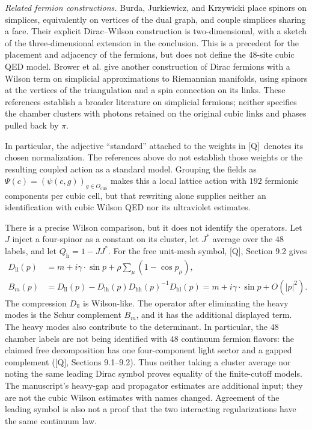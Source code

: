 \documentclass[11pt]{article}
\numberwithin{equation}{section}
\newcommand{\Q}{\textup{[Q]}}
\begin{document}
\emph{Related fermion constructions.} Burda, Jurkiewicz, and
Krzywicki \cite[Section 1 and Section 2.4]{BurdaJurkiewiczKrzywicki1999}
place spinors on simplices, equivalently on vertices of the dual
graph, and couple simplices sharing a face. Their explicit
Dirac--Wilson construction is two-dimensional, with a sketch of
the three-dimensional extension in the conclusion. This is a
precedent for the placement and adjacency of the fermions, but
does not define the $48$-site cubic QED model. Brower et al.
\cite[Sections 3--4]{BrowerEtAl2017} give another construction of
Dirac fermions with a Wilson term on simplicial approximations to
Riemannian manifolds, using spinors at the vertices of the
triangulation and a spin connection on its links. These references
establish a broader literature on simplicial fermions; neither
specifies the chamber clusters with photons retained on the
original cubic links and phases pulled back by $\pi$.

In particular, the adjective ``standard'' attached to the weights
in \Q\ denotes its chosen normalization. The references above do
not establish those weights or the resulting coupled action as a
standard model. Grouping the fields as
$\Psi(c)=(\psi(c,g))_{g\in O_{\mathrm{cub}}}$ makes this a local
lattice action with $192$ fermionic components per cubic cell, but
that rewriting alone supplies neither an identification with
cubic Wilson QED nor its ultraviolet estimates.

There is a precise Wilson comparison, but it does not identify the
operators. Let $J$ inject a four-spinor as a constant on its cluster,
let $J^*$ average over the $48$ labels, and let $Q_{\mathrm h}=1-JJ^*$.
For the free unit-mesh symbol, \Q, Section 9.2 gives
\begin{align}
 D_{\mathrm{ll}}(p)&=m+i\gamma\cdot\sin p+
                         \rho\sum_\mu(1-\cos p_\mu),\\
 B_m(p)&=D_{\mathrm{ll}}(p)
         -D_{\mathrm{lh}}(p)D_{\mathrm{hh}}(p)^{-1}D_{\mathrm{hl}}(p)
       =m+i\gamma\cdot\sin p+O(|p|^2).
 \label{eq:digest-Schur}
\end{align}
The compression $D_{\mathrm{ll}}$ is Wilson-like. The operator after
eliminating the heavy modes is the Schur complement $B_m$, and it
has the additional displayed term. The heavy modes also contribute
to the determinant. In particular, the $48$ chamber labels are not
being identified with $48$ continuum fermion flavors: the claimed
free decomposition has one four-component light sector and a gapped
complement (\Q, Sections 9.1--9.2).
Thus neither taking a cluster average nor noting
the same leading Dirac symbol proves equality of the finite-cutoff
models. The manuscript's heavy-gap and propagator estimates are
additional input; they are not the cubic Wilson estimates with names
changed. Agreement of the leading symbol is also not a proof that
the two interacting regularizations have the same continuum law.
\end{document}
